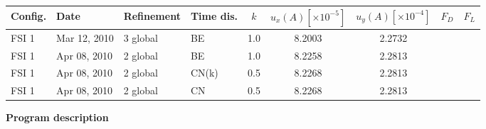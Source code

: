 \begin{table}[h]
   \small
   \centering
     \begin{tabular}{llllccccc}    
       \hline
       Config. & Date & Refinement & Time dis. & $k$ &  $u_x(A) [\times 10^{-5}]$ &$u_y(A) [\times 10^{-4}]$ & $F_D$ & $F_L$  \\ \hline
       FSI 1   & Mar 12, 2010 & 3 global & BE   & 1.0 & 8.2003  & 2.2732  & &        \\
       FSI 1   & Apr 08, 2010 & 2 global & BE   & 1.0 & 8.2258  & 2.2813  & &        \\
       FSI 1   & Apr 08, 2010 & 2 global & CN(k)& 0.5 & 8.2268  & 2.2813  & &        \\
       FSI 1   & Apr 08, 2010 & 2 global & CN   & 0.5 & 8.2268  & 2.2813  & &        \\
     \end{tabular}
  \end{table}

\vspace{0.2cm}

\textbf{Program description}

\vspace{0.2cm}
